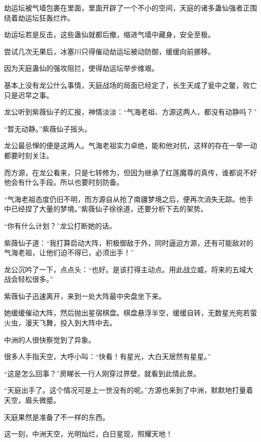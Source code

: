 \begin{this_body}
劫运坛被气墙包裹在里面，里面开辟了一个不小的空间，天庭的诸多蛊仙强者正围绕着劫运坛狂轰烂炸。

劫运坛若是反击，这些蛊仙就都后撤，缩进气墙中藏身，安全至极。

尝试几次无果后，冰塞川只得催动劫运坛被动防御，缓缓向前挪移。

因为天庭蛊仙的强攻阻拦，使得劫运坛举步维艰。

基本上没有龙公什么事情，天庭战场的局面已经定了，长生天成了瓮中之鳖，败亡只是迟早之事。

龙公听到紫薇仙子的汇报，神情淡淡：“气海老祖、方源这两人，都没有动静吗？”

“暂无动静。”紫薇仙子摇头。

龙公最忌惮的便是这两人。气海老祖实力卓绝，能和他对抗，这样的存在一举一动都要时刻关注。

而方源，在龙公看来，只是七转修为，但因为继承了红莲魔尊的真传，谁都说不好他会有什么手段。所以也要时刻防备。

“气海老祖态度仍旧不明，而方源自从抢了南疆梦境之后，便再次消失无踪。他手中已经捏了大量的梦境。”紫薇仙子徐徐道，还要分析下去的架势。

“你有什么计划？”龙公打断她的话。

紫薇仙子道：“我打算启动大阵，积极御敌于外，同时逼迫方源，还有可能敌对的气海老祖，让他们迫不得已，必须出手！”

龙公沉吟了一下，点点头：“也好。是该打得主动点。用此战立威，将来的五域大战会轻松很多。”

紫薇仙子迅速离开，来到一处大阵最中央盘坐下来。

她缓缓催动大阵，然后抛出星宿棋盘。棋盘悬浮半空，缓缓自转，无数星光宛若萤火虫，漫天飞舞，投入到大阵中去。

中洲的人很快察觉到了异象。

很多人手指天空，大呼小叫：“快看！有星光，大白天居然有星星。”

“这是怎么回事？”房睇长一行人刚穿过界壁，就看到此情此景。

“天庭出手了。这个情况可是上一世没有的呢。”方源也来到了中洲，默默地打量着天空，眉头微蹙。

天庭果然是准备了不一样的东西。

这一刻，中洲天空，光明灿烂，白日星现，照耀天地！

\end{this_body}

